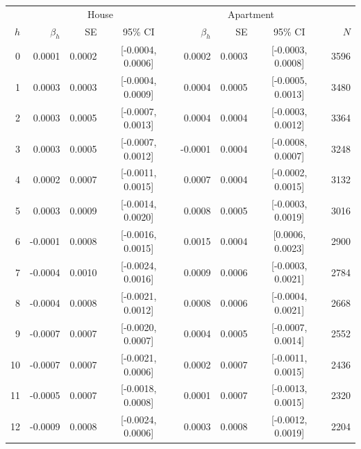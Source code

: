 \begin{tabular}{r r r c r r c r}
\toprule
 & \multicolumn{3}{c}{House} & \multicolumn{3}{c}{Apartment} & \\
$h$ & $\beta_h$ & SE & 95\% CI & $\beta_h$ & SE & 95\% CI & $N$ \\
\midrule
0 & 0.0001 & 0.0002 & [-0.0004, 0.0006] & 0.0002 & 0.0003 & [-0.0003, 0.0008] & 3596 \\
1 & 0.0003 & 0.0003 & [-0.0004, 0.0009] & 0.0004 & 0.0005 & [-0.0005, 0.0013] & 3480 \\
2 & 0.0003 & 0.0005 & [-0.0007, 0.0013] & 0.0004 & 0.0004 & [-0.0003, 0.0012] & 3364 \\
3 & 0.0003 & 0.0005 & [-0.0007, 0.0012] & -0.0001 & 0.0004 & [-0.0008, 0.0007] & 3248 \\
4 & 0.0002 & 0.0007 & [-0.0011, 0.0015] & 0.0007 & 0.0004 & [-0.0002, 0.0015] & 3132 \\
5 & 0.0003 & 0.0009 & [-0.0014, 0.0020] & 0.0008 & 0.0005 & [-0.0003, 0.0019] & 3016 \\
6 & -0.0001 & 0.0008 & [-0.0016, 0.0015] & 0.0015 & 0.0004 & [0.0006, 0.0023] & 2900 \\
7 & -0.0004 & 0.0010 & [-0.0024, 0.0016] & 0.0009 & 0.0006 & [-0.0003, 0.0021] & 2784 \\
8 & -0.0004 & 0.0008 & [-0.0021, 0.0012] & 0.0008 & 0.0006 & [-0.0004, 0.0021] & 2668 \\
9 & -0.0007 & 0.0007 & [-0.0020, 0.0007] & 0.0004 & 0.0005 & [-0.0007, 0.0014] & 2552 \\
10 & -0.0007 & 0.0007 & [-0.0021, 0.0006] & 0.0002 & 0.0007 & [-0.0011, 0.0015] & 2436 \\
11 & -0.0005 & 0.0007 & [-0.0018, 0.0008] & 0.0001 & 0.0007 & [-0.0013, 0.0015] & 2320 \\
12 & -0.0009 & 0.0008 & [-0.0024, 0.0006] & 0.0003 & 0.0008 & [-0.0012, 0.0019] & 2204 \\
\bottomrule
\end{tabular}
